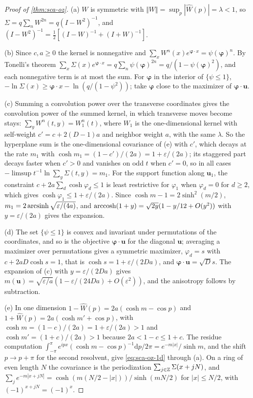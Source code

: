 \begin{proof}[Proof of \cref{thm:sca-oz}]
(a) $W$ is symmetric with $\Vert W\Vert=\sup_p|\hat W(p)|=\lambda<1$, so $\Sigma=q\sum_nW^{2n}=q(I-W^2)^{-1}$, and $(I-W^2)^{-1}=\frac12[(I-W)^{-1}+(I+W)^{-1}]$.

(b) Since $c,a\ge0$ the kernel is nonnegative and $\sum_xW^n(x)e^{\boldsymbol\varphi\cdot x}=\psi(\boldsymbol\varphi)^n$. By Tonelli's theorem $\sum_x\Sigma(x)e^{\boldsymbol\varphi\cdot x}=q\sum_n\psi(\boldsymbol\varphi)^{2n}=q/(1-\psi(\boldsymbol\varphi)^2)$, and each nonnegative term is at most the sum. For $\boldsymbol\varphi$ in the interior of $\{\psi\le1\}$, $-\ln\Sigma(x)\ge\boldsymbol\varphi\cdot x-\ln(q/(1-\psi^2))$; take $\boldsymbol\varphi$ close to the maximizer of $\boldsymbol\varphi\cdot\mathbf u$.

(c) Summing a convolution power over the transverse coordinates gives the convolution power of the summed kernel, in which transverse moves become stays: $\sum_yW^n(t,y)=W_1^n(t)$, where $W_1$ is the one-dimensional kernel with self-weight $c'=c+2(D-1)a$ and neighbor weight $a$, with the same $\lambda$. So the hyperplane sum is the one-dimensional covariance of (e) with $c'$, which decays at the rate $m_1$ with $\cosh m_1=(1-c')/(2a)=1+\varepsilon/(2a)$; its staggered part decays faster when $c'>0$ and vanishes on odd $t$ when $c'=0$, so in all cases $-\limsup t^{-1}\ln\sum_y\Sigma(t,y)=m_1$. For the support function along $\mathbf u_1$, the constraint $c+2a\sum_d\cosh\varphi_d\le1$ is least restrictive for $\varphi_1$ when $\varphi_d=0$ for $d\ge2$, which gives $\cosh\varphi_1\le1+\varepsilon/(2a)$. Since $\cosh m-1=2\sinh^2(m/2)$, $m_1=2\operatorname{arcsinh}\sqrt{\varepsilon/(4a)}$, and $\operatorname{arccosh}(1+y)=\sqrt{2y}(1-y/12+O(y^2))$ with $y=\varepsilon/(2a)$ gives the expansion.

(d) The set $\{\psi\le1\}$ is convex and invariant under permutations of the coordinates, and so is the objective $\boldsymbol\varphi\cdot\mathbf u$ for the diagonal $\mathbf u$; averaging a maximizer over permutations gives a symmetric maximizer, $\varphi_d=s$ with $c+2aD\cosh s=1$, that is $\cosh s=1+\varepsilon/(2Da)$, and $\boldsymbol\varphi\cdot\mathbf u=\sqrt Ds$. The expansion of (c) with $y=\varepsilon/(2Da)$ gives $m(\mathbf u)=\sqrt{\varepsilon/a}(1-\varepsilon/(24Da)+O(\varepsilon^2))$, and the anisotropy follows by subtraction.

(e) In one dimension $1-\hat W(p)=2a(\cosh m-\cos p)$ and $1+\hat W(p)=2a(\cosh m'+\cos p)$, with $\cosh m=(1-c)/(2a)=1+\varepsilon/(2a)>1$ and $\cosh m'=(1+c)/(2a)>1$ because $2a<1-c\le1+c$. The residue computation $\int_{-\pi}^{\pi}e^{ipx}(\cosh m-\cos p)^{-1}\mathrm{d}p/2\pi=e^{-m|x|}/\sinh m$, and the shift $p\to p+\pi$ for the second resolvent, give \eqref{eq:sca-oz-1d} through (a). On a ring of even length $N$ the covariance is the periodization $\sum_{j\in\mathbb{Z}}\Sigma(x+jN)$, and $\sum_je^{-m|x+jN|}=\cosh(m(N/2-|x|))/\sinh(mN/2)$ for $|x|\le N/2$, with $(-1)^{x+jN}=(-1)^x$.


\end{proof}
